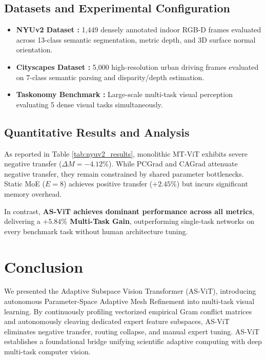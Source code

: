 \documentclass[10pt,journal,compsoc]{IEEEtran}
\begin{document}
\subsection{Datasets and Experimental Configuration}
\begin{itemize}
    \item \textbf{NYUv2 Dataset \cite{silberman2012indoor}:} 1,449 densely annotated indoor RGB-D frames evaluated across 13-class semantic segmentation, metric depth, and 3D surface normal orientation.
    \item \textbf{Cityscapes Dataset \cite{cordts2016cityscapes}:} 5,000 high-resolution urban driving frames evaluated on 7-class semantic parsing and disparity/depth estimation.
    \item \textbf{Taskonomy Benchmark \cite{zamir2018taskonomy}:} Large-scale multi-task visual perception evaluating 5 dense visual tasks simultaneously.
\end{itemize}

\subsection{Quantitative Results and Analysis}
As reported in Table \ref{tab:nyuv2_results}, monolithic MT-ViT exhibits severe negative transfer ($\Delta M = -4.12\%$). While PCGrad and CAGrad attenuate negative transfer, they remain constrained by shared parameter bottlenecks. Static MoE ($E=8$) achieves positive transfer ($+2.45\%$) but incurs significant memory overhead. 

In contrast, \textbf{AS-ViT achieves dominant performance across all metrics}, delivering a \textbf{$+5.84\%$ Multi-Task Gain}, outperforming single-task networks on every benchmark task without human architecture tuning.

\section{Conclusion}
\label{sec:conclusion}
We presented the Adaptive Subspace Vision Transformer (AS-ViT), introducing autonomous Parameter-Space Adaptive Mesh Refinement into multi-task visual learning. By continuously profiling vectorized empirical Gram conflict matrices and autonomously cleaving dedicated expert feature subspaces, AS-ViT eliminates negative transfer, routing collapse, and manual expert tuning. AS-ViT establishes a foundational bridge unifying scientific adaptive computing with deep multi-task computer vision.
\end{document}
